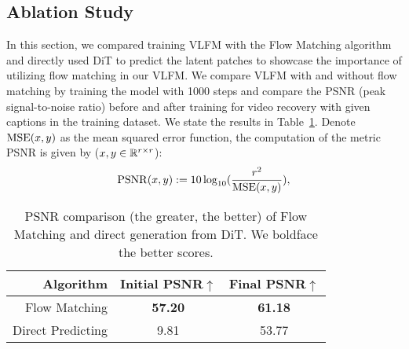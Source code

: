 \subsection{Ablation Study} \label{sub:exp_ablation}

In this section, we compared training VLFM with the Flow Matching algorithm and directly used DiT to predict the latent patches to showcase the importance of utilizing flow matching in our VLFM. We compare VLFM with and without flow matching by training the model with 1000 steps and compare the PSNR (peak signal-to-noise ratio) before and after training for video recovery with given captions in the training dataset. We state the results in Table~\ref{tab:ablation}. Denote ${\rm MSE}(x,y)$ as the mean squared error function, the computation of the metric PSNR is given by ($x,y \in \mathbb{R}^{r\times r}$):
\ifdefined\isarxiv
\else
\vspace{-3mm}
\fi
\begin{align*}
    {\rm PSNR}(x,y) := 10 \log_{10}(\frac{r^2}{{\rm MSE}(x,y)}), 
\end{align*}
\ifdefined\isarxiv
\else
\vspace{-3mm}
\fi

\begin{table}[!ht]
\ifdefined\isarxiv
\else
\vspace{-2mm}
\fi
\begin{center}
\begin{small}
\begin{sc}
\begin{tabular}{r | c c}
    \toprule
    Algorithm & Initial PSNR$\uparrow$ & Final PSNR$\uparrow$ \\
    \midrule
    Flow Matching & {\bf 57.20} & {\bf 61.18} \\
    Direct Predicting & 9.81 & 53.77 \\
    \bottomrule
\end{tabular}
\end{sc}
\end{small}
\end{center}
\caption{PSNR comparison (the greater, the better) of Flow Matching and direct generation from DiT. We boldface the better scores.}
\label{tab:ablation}
\ifdefined\isarxiv
\else
\vspace{-4mm}
\fi

\end{table}